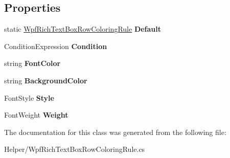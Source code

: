 \subsection*{Properties}
\begin{DoxyCompactItemize}
\item 
static \hyperlink{class_power_system_planning_wpf_app_1_1_helper_1_1_wpf_rich_text_box_row_coloring_rule}{Wpf\+Rich\+Text\+Box\+Row\+Coloring\+Rule} {\bfseries Default}\hypertarget{class_power_system_planning_wpf_app_1_1_helper_1_1_wpf_rich_text_box_row_coloring_rule_afb034e248d32994892e8a9543847b4d3}{}\label{class_power_system_planning_wpf_app_1_1_helper_1_1_wpf_rich_text_box_row_coloring_rule_afb034e248d32994892e8a9543847b4d3}

\item 
Condition\+Expression {\bfseries Condition}\hypertarget{class_power_system_planning_wpf_app_1_1_helper_1_1_wpf_rich_text_box_row_coloring_rule_a40fdf9300385ebbecbe754c817412b6b}{}\label{class_power_system_planning_wpf_app_1_1_helper_1_1_wpf_rich_text_box_row_coloring_rule_a40fdf9300385ebbecbe754c817412b6b}

\item 
string {\bfseries Font\+Color}\hypertarget{class_power_system_planning_wpf_app_1_1_helper_1_1_wpf_rich_text_box_row_coloring_rule_aefe6ec99beaf4b5d925b1a86f1ae7fc6}{}\label{class_power_system_planning_wpf_app_1_1_helper_1_1_wpf_rich_text_box_row_coloring_rule_aefe6ec99beaf4b5d925b1a86f1ae7fc6}

\item 
string {\bfseries Background\+Color}\hypertarget{class_power_system_planning_wpf_app_1_1_helper_1_1_wpf_rich_text_box_row_coloring_rule_abe2cf575d5aa706c349a1c08f1c79305}{}\label{class_power_system_planning_wpf_app_1_1_helper_1_1_wpf_rich_text_box_row_coloring_rule_abe2cf575d5aa706c349a1c08f1c79305}

\item 
Font\+Style {\bfseries Style}\hypertarget{class_power_system_planning_wpf_app_1_1_helper_1_1_wpf_rich_text_box_row_coloring_rule_a5f89b139d56af72e2a1dd268298cb61e}{}\label{class_power_system_planning_wpf_app_1_1_helper_1_1_wpf_rich_text_box_row_coloring_rule_a5f89b139d56af72e2a1dd268298cb61e}

\item 
Font\+Weight {\bfseries Weight}\hypertarget{class_power_system_planning_wpf_app_1_1_helper_1_1_wpf_rich_text_box_row_coloring_rule_ab84a480685c42f6e460536656eb2fec7}{}\label{class_power_system_planning_wpf_app_1_1_helper_1_1_wpf_rich_text_box_row_coloring_rule_ab84a480685c42f6e460536656eb2fec7}

\end{DoxyCompactItemize}


The documentation for this class was generated from the following file\+:\begin{DoxyCompactItemize}
\item 
Helper/Wpf\+Rich\+Text\+Box\+Row\+Coloring\+Rule.\+cs\end{DoxyCompactItemize}
